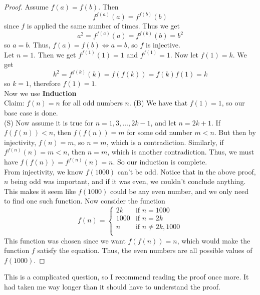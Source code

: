 \begin{proof}
    Assume $f(a) = f(b)$. Then 
\[f^{f(a)}(a) = f^{f(b)}(b)\]
since $f$ is applied the same number of times. Thus we get
\[a^2 = f^{f(a)}(a) = f^{f(b)}(b) = b^2\]
so $a = b$. Thus, $f(a) = f(b) \iff a = b$, so $f$ is injective.\\

Let $n = 1$. Then we get $f^{f(1)}(1) = 1$ and $f^{f(1)} = 1$. Now let $f(1) = k$.
We get
\[k^2 = f^{f(k)}(k) = f(f(k)) = f(k)f(1) = k\]
so $k = 1$, therefore $f(1) = 1$.\\
Now we use \textbf{Induction}\\
Claim: $f(n) = n$ for all odd numbers $n$.
(B) We have that $f(1) = 1$, so our base case is done. \\
(S) Now assume it is true for $n = 1, 3, \ldots, 2k - 1$, and let $n = 2k + 1$. If $f(f(n)) < n$, then $f(f(n)) = m$ for some odd number $m < n$. But then by injectivity, $f(n) = m$, so $n = m$, which is a contradiction. Similarly, if $f^{f(n)}(n) = m < n$, then $n = m$, which is another contradiction. Thus, we must have $f(f(n)) = f^{f(n)}(n) = n$. So our induction is complete.\\
From injectivity, we know $f(1000)$ can't be odd. Notice that in the above proof, $n$ being odd was important, and if it was even, we couldn't conclude anything. This makes it seem like $f(1000)$ could be any even number, and we only need to find one such function. Now consider the function
\[
f(n) =
\begin{cases}
2k & \text{if } n = 1000 \\
1000 & \text{if } n = 2k \\
n & \text{if } n \neq 2k, 1000 \\
\end{cases}
\]
This function was chosen since we want $f(f(n)) = n$, which would make the function $f$ satisfy the equation. Thus, the even numbers are all possible values of $f(1000)$.
\end{proof}
This is a complicated question, so I recommend reading the proof once more. It had taken me way longer than it should have to understand the proof.\\
